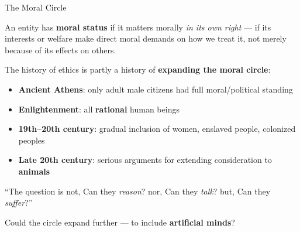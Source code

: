 \documentclass[aspectratio=169,11pt]{beamer}
\begin{document}
\begin{frame}[shrink=5]{The Moral Circle}
\begin{conceptbox}
An entity has \textbf{moral status} if it matters morally \emph{in its own right} --- if its interests or welfare make direct moral demands on how we treat it, not merely because of its effects on others.
\end{conceptbox}

\vspace{0.2cm}
The history of ethics is partly a history of \textbf{expanding the moral circle}:
\begin{itemize}
    \item \textbf{Ancient Athens}: only adult male citizens had full moral/political standing
    \item \textbf{Enlightenment}: all \textbf{rational} human beings
    \item \textbf{19th--20th century}: gradual inclusion of women, enslaved people, colonized peoples
    \item \textbf{Late 20th century}: serious arguments for extending consideration to \textbf{animals}
\end{itemize}

\vspace{0.1cm}
\begin{quotebox}[Bentham (1789)]
\small ``The question is not, Can they \emph{reason}? nor, Can they \emph{talk}? but, Can they \emph{suffer}?''
\end{quotebox}

Could the circle expand further --- to include \textbf{artificial minds}?
\end{frame}
\end{document}
